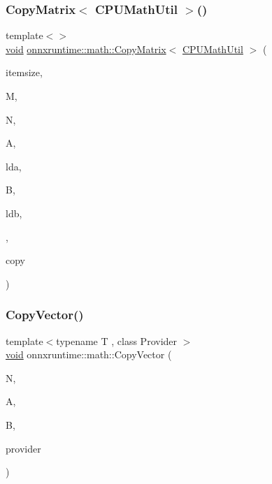 \subsubsection{\texorpdfstring{Copy\+Matrix$<$ C\+P\+U\+Math\+Util $>$()}{CopyMatrix< CPUMathUtil >()}}
{\footnotesize\ttfamily template$<$$>$ \\
\mbox{\hyperlink{mlasi_8h_a88f941d423cb2a819b70a1358982b1a6}{void}} \mbox{\hyperlink{namespaceonnxruntime_1_1math_aad70b3106415e3f15f8486445c356efc}{onnxruntime\+::math\+::\+Copy\+Matrix}}$<$ \mbox{\hyperlink{classonnxruntime_1_1CPUMathUtil}{C\+P\+U\+Math\+Util}} $>$ (\begin{DoxyParamCaption}\item[{const \mbox{\hyperlink{mlasi_8h_a503efbc1c6e50825320ad909366b78ab}{size\+\_\+t}}}]{itemsize,  }\item[{const int}]{M,  }\item[{const int}]{N,  }\item[{const \mbox{\hyperlink{mlasi_8h_a88f941d423cb2a819b70a1358982b1a6}{void}} $\ast$}]{A,  }\item[{const int}]{lda,  }\item[{\mbox{\hyperlink{mlasi_8h_a88f941d423cb2a819b70a1358982b1a6}{void}} $\ast$}]{B,  }\item[{const int}]{ldb,  }\item[{\mbox{\hyperlink{classonnxruntime_1_1CPUMathUtil}{C\+P\+U\+Math\+Util}} $\ast$}]{,  }\item[{\mbox{\hyperlink{namespaceonnxruntime_1_1math_a4fd61c06d9e9e1bc3ceb526787eab4e7}{Typed\+Copy}}}]{copy }\end{DoxyParamCaption})}

\mbox{\label{namespaceonnxruntime_1_1math_aa29e2bcef4e925ce3578b22a4c848f56}} 
\subsubsection{\texorpdfstring{Copy\+Vector()}{CopyVector()}}
{\footnotesize\ttfamily template$<$typename T , class Provider $>$ \\
\mbox{\hyperlink{mlasi_8h_a88f941d423cb2a819b70a1358982b1a6}{void}} onnxruntime\+::math\+::\+Copy\+Vector (\begin{DoxyParamCaption}\item[{const int}]{N,  }\item[{const T $\ast$}]{A,  }\item[{T $\ast$}]{B,  }\item[{Provider $\ast$}]{provider }\end{DoxyParamCaption})}

